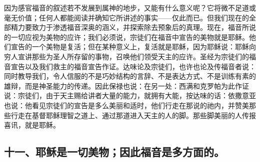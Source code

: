 因为感官福音的叙述若不发展到属神的地步，又能有什么意义呢？它将微不足道或毫无价值；任何人都能阅读并确知它所讲述的事实——仅此而已。但我们现在的全部精力要致力于渗透福音深奥的涵义，并探索除去预象后的真理。现在，福音所说的一切应视为美物的应许；我们必须说，宗徒们在福音中宣告的美物就是耶稣。他们宣告的一个美物是复活；但在某种意义上，复活就是耶稣，因为耶稣说：耶稣向穷人宣讲那些为圣人所存留的事物，召唤他们领受天主的应许。圣经为宗徒们的福音宣告以及我们救主的福音宣告作证。达味论及宗徒们，也许也论及传福音者说：同时教导我们，令人信服的不是巧妙结构的言辞、不是表达方式、不是训练有素的雄辩，而是神圣能力的传递。因此保禄也说：在另一处：西满和克罗帕为此作证说：宗徒们，由于天主赐给讲者大量的能力，就拥有大能，按达味的话：依撒意亚也说：他看见宗徒们的宣告是多么美丽和适时，他们行走在那说的祂内，并赞美那些行走在基督耶稣理智之道上、通过那道进入天主的人的脚。那些脚美丽的人传报喜讯，就是耶稣。\par


\subsection{十一、耶稣是一切美物；因此福音是多方面的。}

